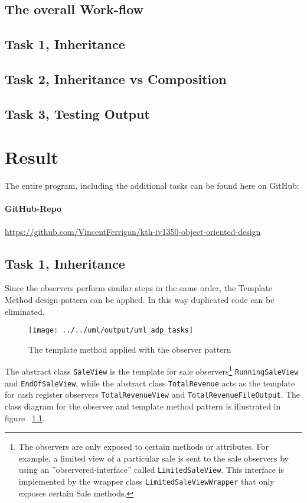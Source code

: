 \documentclass[a4paper]{scrreprt}
\begin{document}
\section*{The overall Work-flow}
\section*{Task 1, Inheritance}
\section*{Task 2, Inheritance vs Composition}
\section*{Task 3, Testing Output}

\newpage
\chapter{Result}
\label{sec:result}
The entire program, including the additional tasks can be found here on GitHub:

\subsubsection*{GitHub-Repo}
\url{https://github.com/VincentFerrigan/kth-iv1350-object-oriented-design}

\section*{Task 1, Inheritance}
Since the observers perform similar steps in the same order,
the Template Method design-pattern can be applied.
In this way duplicated code can be eliminated.

\begin{figure}[H]
    \begin{center}
        \texttt{[image: ../../uml/output/uml\_adp\_tasks]}
        \caption{The template method applied with the observer pattern\\}
        \label{fig:the-observers}
    \end{center}
\end{figure}

The abstract class
\texttt{SaleView} is the template
for sale observers\footnote{The observers are only exposed to certain methods or attributes.
For example, a limited view of a particular sale is sent to the
sale observers by using an ''observered-interface'' called
\texttt{LimitedSaleView}.
This interface is implemented by the wrapper class
\texttt{LimitedSaleViewWrapper} that
only exposes certain Sale methods.}
\texttt{RunningSaleView} and
\texttt{EndOfSaleView},
while the abstract class
\texttt{TotalRevenue}
acts as the template for cash register observers
\texttt{TotalRevenueView} and
\texttt{TotalRevenueFileOutput}.
The class diagram for the observer and template method pattern
is illustrated in figure ~\ref{fig:the-observers}.
\end{document}
